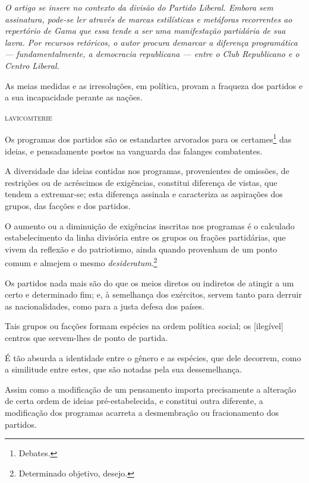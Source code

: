 \begin{didascalia}\itshape
O artigo se insere no contexto da divisão do Partido Liberal. Embora sem
assinatura, pode-se ler através de marcas estilísticas e metáforas
recorrentes ao repertório de Gama que essa tende a ser uma manifestação
partidária de sua lavra. Por recursos retóricos, o autor procura
demarcar a diferença programática --- fundamentalmente, a democracia
republicana --- entre o Club Republicano e o Centro Liberal.
\end{didascalia}



\epigraph{As meias medidas e as irresoluções, em política, provam a fraqueza dos
partidos e a sua incapacidade perante as nações.}{\textsc{lavicomterie}\footnotemark}


Os programas dos partidos são os estandartes arvorados para os
certames\footnote{Debates.} das ideias, e pensadamente postos na
vanguarda das falanges combatentes.

A diversidade das ideias contidas nos programas, provenientes de
omissões, de restrições ou de acréscimos de exigências, constitui
diferença de vistas, que tendem a extremar-se; esta diferença assinala e
caracteriza as aspirações dos grupos, das facções e dos partidos.

O aumento ou a diminuição de exigências inscritas nos programas é o
calculado estabelecimento da linha divisória entre os grupos ou frações
partidárias, que vivem da reflexão e do patriotismo, ainda quando
provenham de um ponto comum e almejem o mesmo \textit{desideratum}.\footnote{
  Determinado objetivo, desejo.}

Os partidos nada mais são do que os meios diretos ou indiretos de
atingir a um certo e determinado fim; e, à semelhança dos exércitos,
servem tanto para derruir as nacionalidades, como para a justa defesa
dos países.

Tais grupos ou facções formam espécies na ordem política social; os
{[}ilegível{]} centros que servem-lhes de ponto de partida.

É tão absurda a identidade entre o gênero e as espécies, que dele
decorrem, como a similitude entre estes, que são notadas pela sua
dessemelhança.

Assim como a modificação de um pensamento importa precisamente a
alteração de certa ordem de ideias pré-estabelecida, e constitui outra
diferente, a modificação dos programas acarreta a desmembração ou
fracionamento dos partidos.

